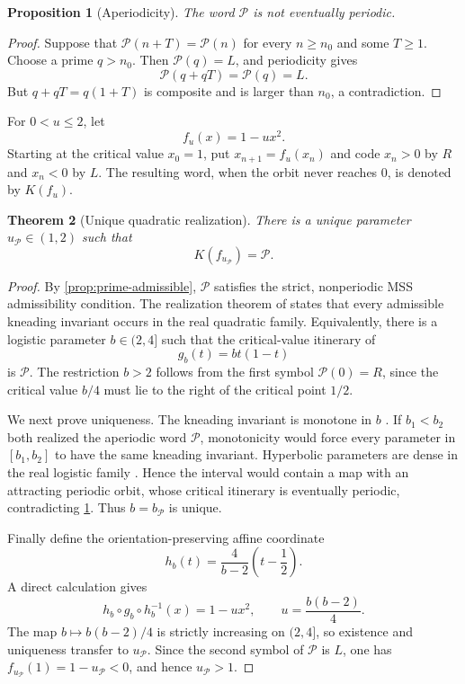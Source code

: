 \documentclass[11pt]{article}
\newtheorem{theorem}{Theorem}[section]
\newtheorem{proposition}[theorem]{Proposition}
\theoremstyle{definition}
\theoremstyle{remark}
\newcommand{\cP}{\mathcal{P}}
\newcommand{\uP}{u_{\mathcal P}}
\newcommand{\bP}{b_{\mathcal P}}
\begin{document}
\begin{proposition}[Aperiodicity]\label{prop:prime-aperiodic}
The word $\cP$ is not eventually periodic.
\end{proposition}

\begin{proof}
Suppose that $\cP(n+T)=\cP(n)$ for every $n\ge n_0$ and some $T\ge1$.  Choose a prime $q>n_0$.  Then $\cP(q)=L$, and periodicity gives
\[
    \cP(q+qT)=\cP(q)=L.
\]
But $q+qT=q(1+T)$ is composite and is larger than $n_0$, a contradiction.
\end{proof}

For $0<u\le2$, let
\begin{equation}\label{eq:quadratic-family}
    f_u(x)=1-u x^2.
\end{equation}
Starting at the critical value $x_0=1$, put $x_{n+1}=f_u(x_n)$ and code $x_n>0$ by $R$ and $x_n<0$ by $L$.  The resulting word, when the orbit never reaches $0$, is denoted by $K(f_u)$.

\begin{theorem}[Unique quadratic realization]\label{thm:unique-realization}
There is a unique parameter $\uP\in(1,2)$ such that
\begin{equation}\label{eq:prime-kneading}
    K(f_{\uP})=\cP.
\end{equation}
\end{theorem}

\begin{proof}
By \cref{prop:prime-admissible}, $\cP$ satisfies the strict, nonperiodic MSS admissibility condition.  The realization theorem of \citet[Thm.~12.1]{MilnorThurston1988} states that every admissible kneading invariant occurs in the real quadratic family.  Equivalently, there is a logistic parameter $b\in(2,4]$ such that the critical-value itinerary of
\[
    g_b(t)=b t(1-t)
\]
is $\cP$.  The restriction $b>2$ follows from the first symbol $\cP(0)=R$, since the critical value $b/4$ must lie to the right of the critical point $1/2$.

We next prove uniqueness.  The kneading invariant is monotone in $b$ \citep[Thm.~13.1]{MilnorThurston1988}.  If $b_1<b_2$ both realized the aperiodic word $\cP$, monotonicity would force every parameter in $[b_1,b_2]$ to have the same kneading invariant.  Hyperbolic parameters are dense in the real logistic family \citep{GraczykSwiatek1997}.  Hence the interval would contain a map with an attracting periodic orbit, whose critical itinerary is eventually periodic, contradicting \cref{prop:prime-aperiodic}.  Thus $b=\bP$ is unique.

Finally define the orientation-preserving affine coordinate
\[
    h_b(t)=\frac{4}{b-2}\left(t-\frac12\right).
\]
A direct calculation gives
\begin{equation}\label{eq:logistic-conjugacy}
    h_b\circ g_b\circ h_b^{-1}(x)=1-u x^2,
    \qquad
    u=\frac{b(b-2)}4.
\end{equation}
The map $b\mapsto b(b-2)/4$ is strictly increasing on $(2,4]$, so existence and uniqueness transfer to $\uP$.  Since the second symbol of $\cP$ is $L$, one has $f_{\uP}(1)=1-\uP<0$, and hence $\uP>1$.
\end{proof}
\end{document}
